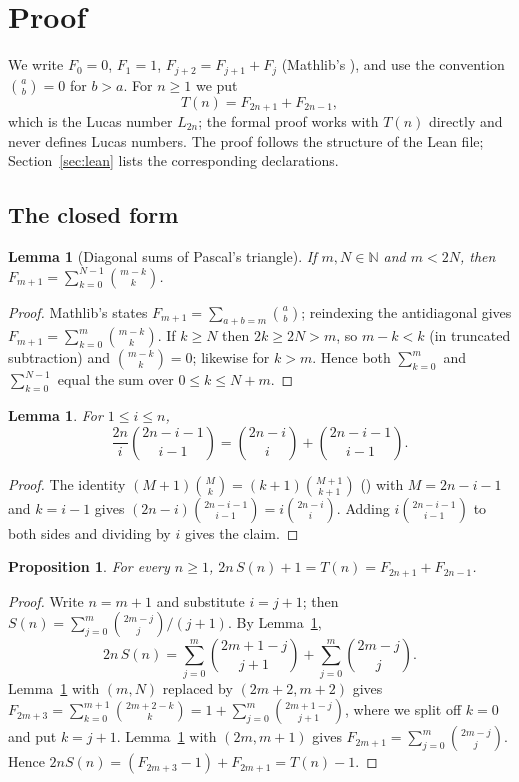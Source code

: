 \documentclass[11pt]{amsart}
\theoremstyle{plain}
\newtheorem{lemma}[theorem]{Lemma}
\newtheorem{proposition}[theorem]{Proposition}
\theoremstyle{definition}
\newcommand{\N}{\mathbb{N}}
\begin{document}
\section{Proof}\label{sec:proof}

We write $F_0=0$, $F_1=1$, $F_{j+2}=F_{j+1}+F_j$ (Mathlib's ), and use the convention $\binom{a}{b}=0$ for $b>a$.
For $n\ge1$ we put
\[
  T(n)=F_{2n+1}+F_{2n-1},
\]
which is the Lucas number $L_{2n}$; the formal proof works with $T(n)$ directly and never defines Lucas numbers.
The proof follows the structure of the Lean file; Section~\ref{sec:lean} lists the corresponding declarations.

\subsection{The closed form}

\begin{lemma}[Diagonal sums of Pascal's triangle]\label{lem:diag}
If $m,N\in\N$ and $m<2N$, then $F_{m+1}=\sum_{k=0}^{N-1}\binom{m-k}{k}$.
\end{lemma}

\begin{proof}
Mathlib's  states $F_{m+1}=\sum_{a+b=m}\binom{a}{b}$; reindexing the antidiagonal gives $F_{m+1}=\sum_{k=0}^{m}\binom{m-k}{k}$.
If $k\ge N$ then $2k\ge 2N>m$, so $m-k<k$ (in truncated subtraction) and $\binom{m-k}{k}=0$; likewise for $k>m$.
Hence both $\sum_{k=0}^{m}$ and $\sum_{k=0}^{N-1}$ equal the sum over $0\le k\le N+m$.
\end{proof}

\begin{lemma}\label{lem:term}
For $1\le i\le n$,
\[
  \frac{2n}{i}\binom{2n-i-1}{i-1}=\binom{2n-i}{i}+\binom{2n-i-1}{i-1}.
\]
\end{lemma}

\begin{proof}
The identity $(M+1)\binom{M}{k}=(k+1)\binom{M+1}{k+1}$ () with $M=2n-i-1$ and $k=i-1$ gives $(2n-i)\binom{2n-i-1}{i-1}=i\binom{2n-i}{i}$.
Adding $i\binom{2n-i-1}{i-1}$ to both sides and dividing by $i$ gives the claim.
\end{proof}

\begin{proposition}\label{prop:closed}
For every $n\ge1$, $2n\,S(n)+1=T(n)=F_{2n+1}+F_{2n-1}$.
\end{proposition}

\begin{proof}
Write $n=m+1$ and substitute $i=j+1$; then $S(n)=\sum_{j=0}^{m}\binom{2m-j}{j}/(j+1)$.
By Lemma~\ref{lem:term},
\[
  2n\,S(n)=\sum_{j=0}^{m}\binom{2m+1-j}{j+1}+\sum_{j=0}^{m}\binom{2m-j}{j}.
\]
Lemma~\ref{lem:diag} with $(m,N)$ replaced by $(2m+2,m+2)$ gives $F_{2m+3}=\sum_{k=0}^{m+1}\binom{2m+2-k}{k}=1+\sum_{j=0}^{m}\binom{2m+1-j}{j+1}$, where we split off $k=0$ and put $k=j+1$.
Lemma~\ref{lem:diag} with $(2m,m+1)$ gives $F_{2m+1}=\sum_{j=0}^{m}\binom{2m-j}{j}$.
Hence $2nS(n)=(F_{2m+3}-1)+F_{2m+1}=T(n)-1$.
\end{proof}
\end{document}
